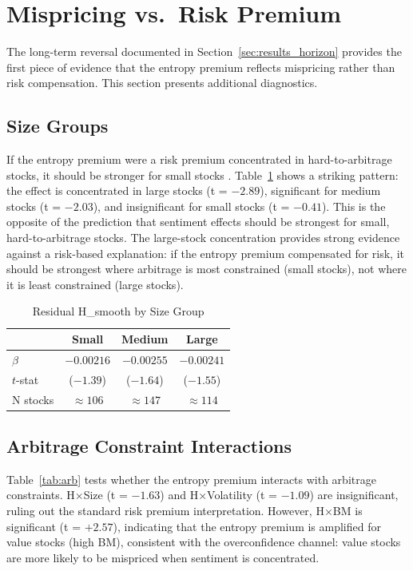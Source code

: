 \documentclass[12pt,a4paper]{article}
\begin{document}
\section{Mispricing vs.\ Risk Premium}\label{sec:mechanism}

The long-term reversal documented in Section~\ref{sec:results_horizon} provides the first piece of evidence that the entropy premium reflects mispricing rather than risk compensation. This section presents additional diagnostics.

\subsection{Size Groups}

If the entropy premium were a risk premium concentrated in hard-to-arbitrage stocks, it should be stronger for small stocks \citep{BakerWurgler2006}. Table~\ref{tab:size} shows a striking pattern: the effect is concentrated in large stocks (t = $-2.89$), significant for medium stocks (t = $-2.03$), and insignificant for small stocks (t = $-0.41$). This is the opposite of the \citet{BakerWurgler2006} prediction that sentiment effects should be strongest for small, hard-to-arbitrage stocks. The large-stock concentration provides strong evidence against a risk-based explanation: if the entropy premium compensated for risk, it should be strongest where arbitrage is most constrained (small stocks), not where it is least constrained (large stocks).

\begin{table}[H]
\centering
\caption{Residual H\_smooth by Size Group}
\label{tab:size}
\small
\begin{tabular}{lccc}
\toprule
 & Small & Medium & Large \\
\midrule
$\beta$ & $-0.00216$ & $-0.00255$ & $-0.00241$ \\
$t$-stat & ($-1.39$) & ($-1.64$) & ($-1.55$) \\
N stocks & $\approx106$ & $\approx147$ & $\approx114$ \\
\bottomrule
\end{tabular}
\end{table}

\subsection{Arbitrage Constraint Interactions}

Table~\ref{tab:arb} tests whether the entropy premium interacts with arbitrage constraints. H$\times$Size (t = $-1.63$) and H$\times$Volatility (t = $-1.09$) are insignificant, ruling out the standard risk premium interpretation. However, H$\times$BM is significant (t = $+2.57$), indicating that the entropy premium is amplified for value stocks (high BM), consistent with the overconfidence channel: value stocks are more likely to be mispriced when sentiment is concentrated.
\end{document}
